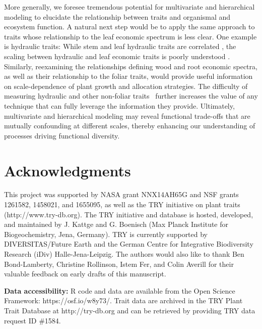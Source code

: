 \documentclass{article}
\begin{document}
More generally, we foresee tremendous potential for multivariate and hierarchical modeling to elucidate the relationship between traits and organismal and ecosystem function.
A natural next step would be to apply the same approach to traits whose relationship to the leaf economic spectrum is less clear.
One example is hydraulic traits:
While stem and leaf hydraulic traits are correlated \citep{bartlett_2016_correlations}, the scaling between hydraulic and leaf economic traits is poorly understood \citep{reich_2014_world,li_2015_leaf}.
Similarly, reexamining the relationships defining wood \citep{chave_2009_towards,fortunel_2012_leaf,baraloto_2010_decoupled} and root \citep{kramer-walter_2016_root,valverde-barrantes_2016_root} economic spectra, as well as their relationship to the foliar traits, would provide useful information on scale-dependence of plant growth and allocation strategies.
The difficulty of measuring hydraulic and other non-foliar traits~\cite[e.g.][]{jansen_2015_current} further increases the value of any technique that can fully leverage the information they provide.
Ultimately, multivariate and hierarchical modeling may reveal functional trade-offs that are mutually confounding at different scales, thereby enhancing our understanding of processes driving functional diversity.

\section{Acknowledgments}

This project was supported by NASA grant NNX14AH65G and NSF grants 1261582, 1458021, and 1655095, as well as the TRY initiative on plant traits (http://www.try-db.org).
The TRY initiative and database is hosted, developed, and maintained by J. Kattge and G. Boenisch (Max Planck Institute for Biogeochemistry, Jena, Germany).
TRY is currently supported by DIVERSITAS/Future Earth and the German Centre for Integrative Biodiversity Research (iDiv) Halle-Jena-Leipzig.
The authors would also like to thank Ben Bond-Lamberty, Christine Rollinson, Istem Fer, and Colin Averill for their valuable feedback on early drafts of this manuscript.



\vspace{5mm}

\noindent
\textbf{Data accessibility:}
R code and data are available from the Open Science Framework: https://osf.io/w8y73/.
Trait data are archived in the TRY Plant Trait Database at http://try-db.org and can be retrieved by providing TRY data request ID \#1584.
\end{document}
